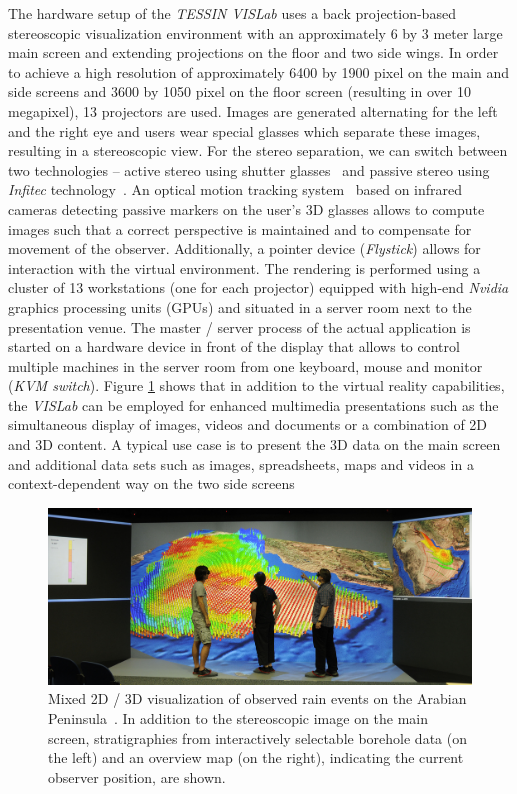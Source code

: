\documentclass[twocolumn]{svjour3}          %
\begin{document}
The hardware setup of the \emph{TESSIN VISLab} uses a back projection-based stereoscopic visualization environment with an approximately 6 by 3 meter large main screen and extending projections on the floor and two side wings. In order to achieve a high resolution of approximately 6400 by 1900 pixel on the main and side screens and 3600 by 1050 pixel on the floor screen (resulting in over 10 megapixel), 13 projectors are used. Images are generated alternating for the left and the right eye and users wear special glasses which separate these images, resulting in a stereoscopic view. For the stereo separation, we can switch between two technologies -- active stereo using shutter glasses~\cite{activestereo} and passive stereo using \emph{Infitec} technology~\cite{infitec}. An optical motion tracking system~\cite{tracking} based on infrared cameras detecting passive markers on the user's 3D glasses allows to compute images such that a correct perspective is maintained and to compensate for movement of the observer. Additionally, a pointer device (\emph{Flystick}) allows for interaction with the virtual environment. The rendering is performed using a cluster of 13 workstations (one for each projector) equipped with high-end \emph{Nvidia} graphics processing units (GPUs) and situated in a server room next to the presentation venue. The master / server process of the actual application is started on a hardware device in front of the display that allows to control multiple machines in the server room from one keyboard, mouse and monitor (\emph{KVM switch}). Figure \ref{fig:sa}  shows that in addition to the virtual reality capabilities, the \emph{VISLab} can be employed for enhanced multimedia presentations such as the simultaneous display of images, videos and documents or a combination of 2D and 3D content. A typical use case is to present the 3D data on the main screen and additional data sets such as images, spreadsheets, maps and videos in a context-dependent way on the two side screens~\cite{zehner:2d3d}

\begin{figure}
  \includegraphics[width=1.0\textwidth]{images/sa_2d_3d.jpg}
\caption{Mixed 2D / 3D visualization of observed rain events on the Arabian Peninsula~\cite{rink:iwas}. In addition to the stereoscopic image on the main screen, stratigraphies from interactively selectable borehole data (on the left) and an overview map (on the right), indicating the current observer position, are shown.}
\label{fig:sa}
\end{figure}
\end{document}
